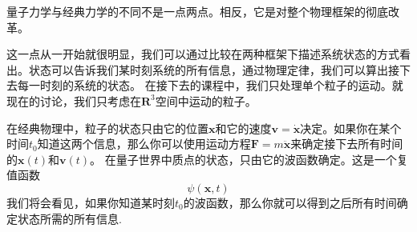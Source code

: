 量子力学与经典力学的不同不是一点两点。相反，它是对整个物理框架的彻底改革。\par
这一点从一开始就很明显，我们可以通过比较在两种框架下描述系统状态的方式看出。状态可以告诉我们某时刻系统的所有信息，通过物理定律，我们可以算出接下去每一时刻的系统的状态。 在接下去的课程中，我们只处理单个粒子的运动。就现在的讨论，我们只考虑在$\mathbf{R}^3$空间中运动的粒子。\par
在经典物理中，粒子的状态只由它的位置$\mathbf{x}$和它的速度$\mathbf{v}=\dot{\mathbf{x}}$决定。如果你在某个时间$t_0$知道这两个信息，那么你可以使用运动方程$\mathbf{F} = m\ddot{\mathbf{x}}$来确定接下去所有时间的$\mathbf{x}(t)$和$\mathbf{v}(t)$。
在量子世界中质点的状态，只由它的波函数确定。这是一个复值函数
\[
    \psi(\mathbf{x},t)
\]
我们将会看见，如果你知道某时刻$t_0$的波函数，那么你就可以得到之后所有时间确定状态所需的所有信息.\par
